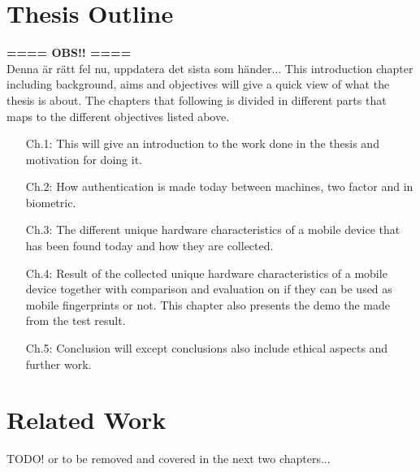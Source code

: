 \section{Thesis Outline}\label{sec:outline}
\textbf{ ==== OBS!! ====}\\ Denna är rätt fel nu, uppdatera det sista som händer...
This introduction chapter including background, aims and objectives will give a quick view of what the thesis is about. The chapters that following is divided in different parts that maps to the different objectives listed above.
\begin{itemize}
	\item[Ch.1: ]	This will give an introduction to the work done in the thesis and motivation for doing it.
	\item[Ch.2: ]	How authentication is made today between machines, two factor and in biometric.
	\item[Ch.3: ]	The different unique hardware characteristics of a mobile device that has been found today and how they are collected.
	\item[Ch.4: ]	Result of the collected unique hardware characteristics of a mobile device together with comparison and evaluation on if they can be used as mobile fingerprints or not. This chapter also presents the demo the made from the test result.
	\item[Ch.5: ]	Conclusion will except conclusions also include ethical aspects and further work. 
\end{itemize}


\section{Related Work}\label{sec:relatedWork}
TODO! or to be removed and covered in the next two chapters...
